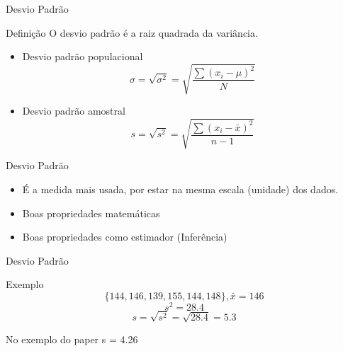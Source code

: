 \documentclass{beamer}
\begin{document}
\begin{frame}{\scriptsize Desvio Padrão}
  \begin{block}{Definição}
    O desvio padrão é a raiz quadrada da variância.
  \end{block}
  \begin{itemize}
    \footnotesize
  \item Desvio padrão populacional
    $$ \sigma = \sqrt{ \sigma^2 } = \sqrt{ \frac{\sum (x_i - \mu)^2}{N} } $$
    \bigskip
  \item Desvio padrão amostral
    $$ s = \sqrt{s^2 } = \sqrt{ \frac{\sum (x_i - \bar{x})^2}{n-1} } $$
  \end{itemize}
\end{frame}

\begin{frame}{\scriptsize Desvio Padrão}
  \begin{itemize}
    \footnotesize
  \item É a medida mais usada, por estar na mesma escala (unidade) dos
    dados.
    \bigskip
  \item Boas propriedades matemáticas
    \bigskip
  \item Boas propriedades como estimador (Inferência)
  \end{itemize}
\end{frame}

\begin{frame}{\scriptsize Desvio Padrão}
  \begin{exampleblock}{Exemplo}
    \scriptsize
      \begin{displaymath}
        \{144, 146, 139, 155, 144, 148\}, \bar{x} = 146
      \end{displaymath}
      \medskip
      \begin{displaymath}
        s^2 = 28.4
      \end{displaymath}
      \medskip
      \begin{displaymath}
        s = \sqrt{s^2} = \sqrt{28.4} = 5.3
    \end{displaymath}
  \end{exampleblock}
  \begin{block}{No exemplo do paper}
    \footnotesize
    s = 4.26
  \end{block}
\end{frame}
\end{document}
